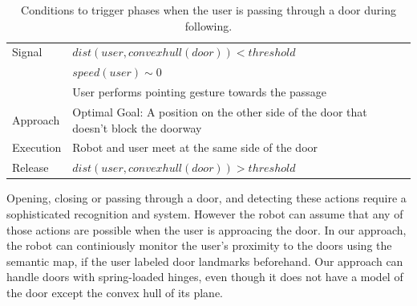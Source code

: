 \begin{table}[H]
	\centering
  \begin{tabular}{l |  m{10cm}}    
    \toprule    
    Signal & {$dist(user, convexhull(door))<threshold$}\\         
    	      & {$speed(user)\sim 0$} \\
	      & {User performs pointing gesture towards the passage}\\ \midrule	                           
    Approach & {Optimal Goal: A position on the other side of the door that doesn't block the doorway}\\       \midrule
    Execution & {Robot and user meet at the same side of the door}\\  \midrule
    Release & {$dist(user, convexhull(door))>threshold$ }\\ 
    \bottomrule
  \end{tabular}
      \caption{Conditions to trigger phases when the user is passing through a door during following.}
    \label{table:situation_aware_list_group}
\end{table}


Opening, closing or passing through a door, and detecting these actions require a sophisticated recognition and system. However the robot can assume that any of those actions are possible when the user is approacing the door. In our approach, the robot can continiously monitor the user's proximity to the doors using the semantic map, if the user labeled door landmarks beforehand. Our approach can handle doors with spring-loaded hinges, even though it does not have a model of the door except the convex hull of its plane.

